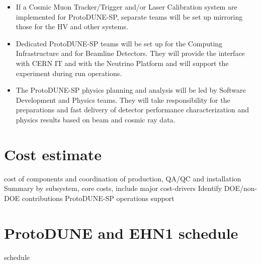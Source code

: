 \begin{itemize}
\item If a Cosmic Muon Tracker/Trigger and/or Laser Calibration system are implemented for ProtoDUNE-SP, separate teams will be set up mirroring those for the HV and other systems. 
\item Dedicated ProtoDUNE-SP teams will be set up for the Computing Infrastructure and for Beamline Detectors. They will provide the interface with CERN IT and with the Neutrino Platform and will support the experiment during run operations.
\item The ProtoDUNE-SP physics planning and analysis will be led by Software Development and Physics teams. They will take responsibility for the preparations and fast delivery of detector performance characterization and physics results based on beam and cosmic ray data.
\end{itemize}

\section{Cost estimate}

cost of components and coordination of production, QA/QC and installation\\

Summary by subsystem, core costs, include major cost-drivers
Identify DOE/non-DOE contributions
ProtoDUNE-SP operations support


\section{ProtoDUNE and EHN1 schedule}

schedule\\


